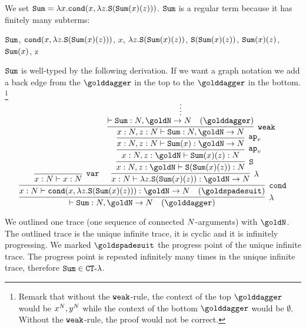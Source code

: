\begin{Eg}
\label{example-sum}
We set ${\tt Sum} = \lambda x.{\tt cond}(x,\lambda z.{\tt S}({\tt Sum}(x)(z)))$.
${\tt Sum}$ is a regular term because it has finitely many subterms: 
\begin{center}
  ${\tt Sum}$,
  \quad
  ${\tt cond}(x,\lambda z.{\tt S}({\tt Sum}(x)(z)))$,
  \quad
  $x$,
  \quad
  $\lambda z.{\tt S}({\tt Sum}(x)(z))$,
 \quad
  ${\tt S}({\tt Sum}(x)(z))$,
  \quad
  ${\tt Sum}(x)(z)$,
  \quad
  ${\tt Sum}(x)$,
  \quad
   z
\end{center}
${\tt Sum}$ is well-typed by the following derivation. If we want a graph notation
we add a back edge from the  $\golddagger$ in the top to the $\golddagger$ in the 
bottom. 
\footnote{Remark that without the ${\tt weak}$-rule, the context of the top
$\golddagger$ would be $x^{N}, y^{N}$ while the context of the 
bottom $\golddagger$ would be $\emptyset$. Without the ${\tt weak}$-rule, the proof would not be correct.}
\[
\infer[\lambda]{
  \vdash \Sum:\N, 
  \goldN
  \rightarrow \N 
   \quad (\golddagger)
}{
  \infer[\cond]{
    x : \N \vdash 
    \cond(x,\lambda z.\Succ(\Sum(x)(z))): \goldN \rightarrow \N
     \quad (\goldspadesuit)
  }{
    \infer[\var]{
      x : \N \vdash x : \N
    }{}
    &
    \infer[\lambda]{
      x:\N \vdash \lambda z.\Succ(\Sum(x)(z)): \goldN \rightarrow \N  
    }{
      \infer[\Succ]{
        x:\N, z : \goldN 
        \vdash \Succ(\Sum(x)(z)): \N  
      }{
        \infer[\apvar]{
          x:\N, z : \goldN 
          \vdash \Sum(x)(z): \N
        }{
          \infer[\apvar]{
            x:\N,  z : \N
            \vdash \Sum(x): \goldN \rightarrow \N
          }{
            \infer[\weak]{
              x:\N,  z : \N
              \vdash \Sum: \N, \goldN \rightarrow  \N
            }{
              \infer*{\vdash \Sum: \N, \goldN \rightarrow \N 
                \quad (\golddagger)}{}
            }
          }
        }
      }
    }
  }
}
\]
\end{Eg}

We %
outlined one trace (one sequence of connected ${N}$-arguments)
with $\goldN$. The outlined trace is the unique 
infinite trace, it is cyclic and it is infinitely progressing.
We marked $\goldspadesuit$ the progress point of the unique infinite trace.
The progress point is repeated infinitely many times in the unique infinite trace,
therefore ${\tt Sum} \in { {\tt CT}\mbox{-}\lambda}$. 


%


